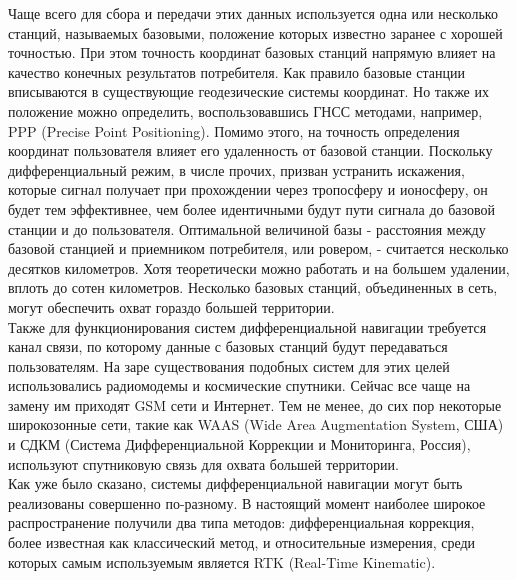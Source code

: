 \documentclass[a4paper,12pt]{report}
\begin{document}
Чаще всего для сбора и передачи этих данных используется одна или несколько станций, называемых 
базовыми, положение которых известно заранее с хорошей точностью. При этом точность координат базовых станций напрямую влияет на качество 
конечных результатов потребителя. Как правило базовые станции вписываются в существующие геодезические системы координат. Но также их 
положение можно определить, воспользовавшись ГНСС методами, например, PPP (Precise Point Positioning). Помимо этого, на точность определения 
координат пользователя влияет его удаленность от базовой станции. Поскольку дифференциальный режим, в числе прочих, призван устранить 
искажения, которые сигнал получает при прохождении через тропосферу и ионосферу, он будет тем эффективнее, чем более идентичными будут пути 
сигнала до базовой станции и до пользователя. Оптимальной величиной базы - расстояния между базовой станцией и приемником потребителя, или 
ровером, - считается несколько десятков километров. Хотя теоретически можно работать и на большем удалении, вплоть до сотен километров. 
Несколько базовых станций, объединенных в сеть, могут обеспечить охват гораздо большей территории. \\
Также для функционирования систем 
дифференциальной навигации требуется канал связи, по которому данные с базовых станций будут передаваться пользователям. На заре существования 
подобных систем для этих целей использовались радиомодемы и космические спутники. Сейчас все чаще на замену им приходят GSM сети и Интернет. 
Тем не менее, до сих пор некоторые широкозонные сети, такие как WAAS (Wide Area Augmentation System, США) и СДКМ (Система Дифференциальной 
Коррекции и Мониторинга, Россия), используют спутниковую связь для охвата большей территории. \\
Как уже было сказано, системы дифференциальной навигации могут быть реализованы совершенно по-разному. В настоящий момент наиболее широкое 
распространение получили два типа методов: дифференциальная коррекция, более известная как классический метод, и относительные измерения, 
среди которых самым используемым является RTK (Real-Time Kinematic).
\end{document}
